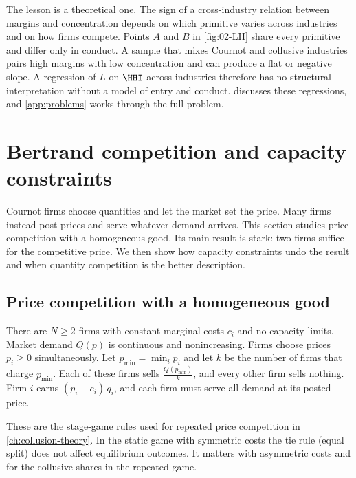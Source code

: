 The lesson is a theoretical one. The sign of a cross-industry relation between margins and concentration depends on
which primitive varies across industries and on how firms compete. Points $A$ and $B$ in \cref{fig:02-LH} share every
primitive and differ only in conduct. A sample that mixes Cournot and collusive industries pairs high margins with low
concentration and can produce a flat or negative slope. A regression of $L$ on $\HHI$ across industries therefore has
no structural interpretation without a model of entry and conduct.  discusses these regressions, and
\cref{app:problems} works through the full problem.

\section{Bertrand competition and capacity constraints}\label{sec:02-bertrand}

Cournot firms choose quantities and let the market set the price. Many firms instead post prices and serve whatever
demand arrives. This section studies price competition with a homogeneous good. Its main result is stark: two firms
suffice for the competitive price. We then show how capacity constraints undo the result and when quantity
competition is the better description.

\subsection{Price competition with a homogeneous good}\label{sec:02-bertrand-homog}

\begin{definition}\label{def:02-bertrand}
There are $N \ge 2$ firms with constant marginal costs $c_i$ and no capacity limits. Market demand $Q(p)$ is
continuous and nonincreasing. Firms choose prices $p_i \ge 0$ simultaneously. Let $p_{\min} = \min_i p_i$ and let
$k$ be the number of firms that charge $p_{\min}$. Each of these firms sells $\frac{Q(p_{\min})}{k}$, and every other
firm sells nothing. Firm $i$ earns $(p_i - c_i)\, q_i$, and each firm must serve all demand at its posted price.
\end{definition}

These are the stage-game rules used for repeated price competition in \cref{ch:collusion-theory}. In the static game
with symmetric costs the tie rule (equal split) does not affect equilibrium outcomes. It matters with asymmetric
costs and for the collusive shares in the repeated game.

